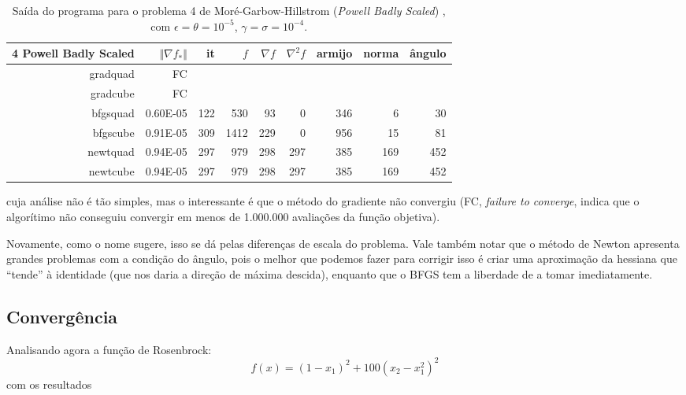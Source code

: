 \documentclass[a4paper,11pt]{article}
\begin{document}
        \begin{table}[h!]
            \centering
            \begin{tabular}{r|rrrrrrrr}
                4 Powell Badly Scaled & $\Vert\nabla f_*\Vert$ & it & $f$ & $\nabla f $ & $\nabla^2f$ & armijo & norma & ângulo \\
                \hline
                gradquad&        FC \\
                gradcube&        FC \\
                bfgsquad&  0.60E-05&       122&       530&        93&         0&       346&         6&        30 \\
                bfgscube&  0.91E-05&       309&      1412&       229&         0&       956&        15&        81 \\
                newtquad&  0.94E-05&       297&       979&       298&       297&       385&       169&       452 \\
                newtcube&  0.94E-05&       297&       979&       298&       297&       385&       169&       452 \\
            \end{tabular}
            \caption{Saída do programa para o problema 4 de Moré-Garbow-Hillstrom (\emph{Powell Badly Scaled}) , com $\epsilon = \theta = 10^{-5} $, $\gamma = \sigma = 10^{-4}$.}
        \end{table}
        cuja análise não é tão simples, mas o interessante é que o método do gradiente não convergiu (FC, \emph{failure to converge}, indica que o algorítimo não conseguiu convergir em menos de 1.000.000 avaliações da função objetiva).

        Novamente, como o nome sugere, isso se dá pelas diferenças de escala do problema.
        Vale também notar que o método de Newton apresenta grandes problemas com a condição do ângulo, pois o melhor que podemos fazer para corrigir isso é criar uma aproximação da hessiana que ``tende'' à identidade (que nos daria a direção de máxima descida), enquanto que o BFGS tem a liberdade de a tomar imediatamente.

        \subsection*{Convergência}
            Analisando agora a função de Rosenbrock:
                $$ f(x) = (1 - x_1)^2 + 100(x_2 - x_1^2)^2 $$
            com os resultados
\end{document}
